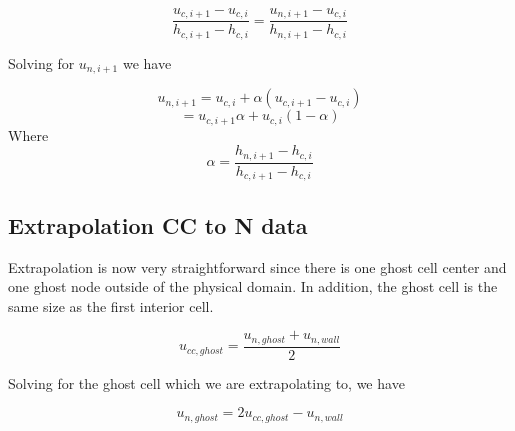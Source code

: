 \documentclass[11pt]{article}
\begin{document}
\begin{equation}
	\frac{u_{c,i+1}-u_{c,i}}{h_{c,i+1}-h_{c,i}} =
	\frac{u_{n,i+1}-u_{c,i}}{h_{n,i+1}-h_{c,i}}
\end{equation}

Solving for $u_{n,i+1}$ we have

\begin{equation}
	u_{n,i+1} = u_{c,i} + \alpha (u_{c,i+1}-u_{c,i})
\end{equation}
\begin{equation}
	= u_{c,i+1}\alpha + u_{c,i}(1-\alpha)
\end{equation}
Where
\begin{equation}
	\alpha = \frac{h_{n,i+1}-h_{c,i}}{h_{c,i+1}-h_{c,i}}
\end{equation}

\subsection{Extrapolation CC to N data}
Extrapolation is now very straightforward since there is one ghost cell center and one ghost node outside of the physical domain. In addition, the ghost cell is the same size as the first interior cell.

\begin{equation}
	u_{cc,ghost} = \frac{u_{n,ghost} + u_{n,wall}}{2}
\end{equation}

Solving for the ghost cell which we are extrapolating to, we have

\begin{equation}
	u_{n,ghost} = 2u_{cc,ghost} - u_{n,wall}
\end{equation}
\end{document}
